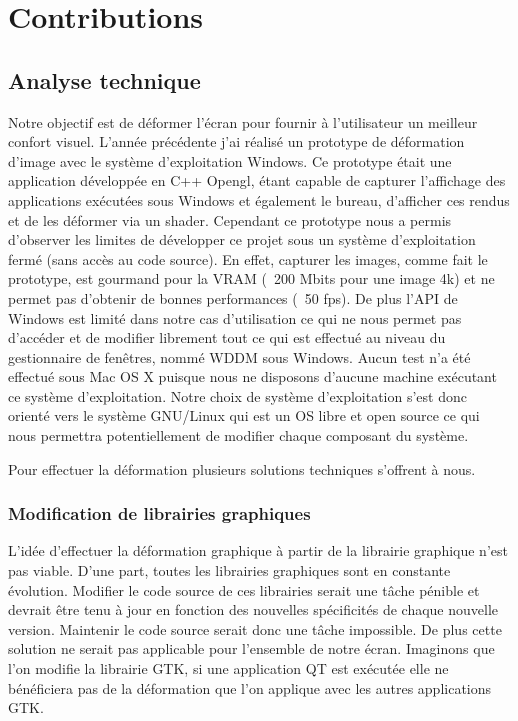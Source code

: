 \chapter{Contributions}

\section{Analyse technique}

Notre objectif est de déformer l'écran pour fournir à l'utilisateur un meilleur confort visuel. 
L'année précédente j'ai réalisé un prototype de déformation d'image avec le système d'exploitation Windows. Ce prototype était une application développée en C++ Opengl, étant capable de capturer l'affichage des applications exécutées sous Windows et également le bureau, d'afficher ces rendus et de les déformer via un shader.
Cependant ce prototype nous a permis d'observer les limites de développer ce projet sous un système d'exploitation fermé (sans accès au code source). En effet, capturer les images, comme fait le prototype, est gourmand pour la VRAM (~200 Mbits pour une image 4k) et ne permet pas d'obtenir de bonnes performances (~50 fps). De plus l'API de Windows est limité dans notre cas d'utilisation ce qui ne nous permet pas d'accéder et de modifier librement tout ce qui est effectué au niveau du gestionnaire de fenêtres, nommé WDDM sous Windows. Aucun test n'a été effectué sous Mac OS X puisque nous ne disposons d'aucune machine exécutant ce système d'exploitation. Notre choix de système d'exploitation s'est donc orienté vers le système GNU/Linux qui est un OS libre et open source ce qui nous permettra potentiellement de modifier chaque composant du système.

Pour effectuer la déformation plusieurs solutions techniques s'offrent à nous.

\subsection{Modification de librairies graphiques}

L'idée d'effectuer la déformation graphique à partir de la librairie graphique n'est pas viable. D'une part, toutes les librairies graphiques sont en constante évolution. Modifier le code source de ces librairies serait une tâche pénible et devrait être tenu à jour en fonction des nouvelles spécificités de chaque nouvelle version. Maintenir le code source serait donc une tâche impossible. De plus cette solution ne serait pas applicable pour l'ensemble de notre écran. Imaginons que l'on modifie la librairie GTK, si une application QT est exécutée elle ne bénéficiera pas de la déformation que l'on applique avec les autres applications GTK.

